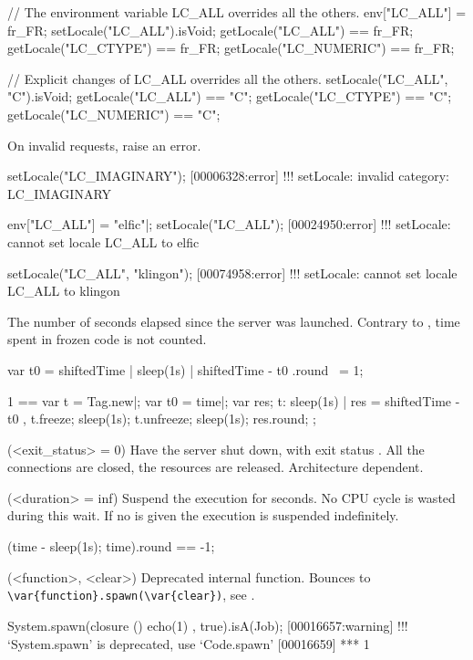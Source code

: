 \begin{urbiscriptapi}
\begin{urbiassert}
// The environment variable LC_ALL overrides all the others.
env["LC_ALL"] = fr_FR;
setLocale("LC_ALL").isVoid;
getLocale("LC_ALL")     == fr_FR;
getLocale("LC_CTYPE")   == fr_FR;
getLocale("LC_NUMERIC") == fr_FR;

// Explicit changes of LC_ALL overrides all the others.
setLocale("LC_ALL", "C").isVoid;
getLocale("LC_ALL")     == "C";
getLocale("LC_CTYPE")   == "C";
getLocale("LC_NUMERIC") == "C";
\end{urbiassert}

  On invalid requests, raise an error.
\begin{urbiscript}
setLocale("LC_IMAGINARY");
[00006328:error] !!! setLocale: invalid category: LC_IMAGINARY

env["LC_ALL"] = "elfic"|;
setLocale("LC_ALL");
[00024950:error] !!! setLocale: cannot set locale LC_ALL to elfic

setLocale("LC_ALL", "klingon");
[00074958:error] !!! setLocale: cannot set locale LC_ALL to klingon
\end{urbiscript}


\item[shiftedTime] The number of seconds elapsed since the \urbi server was
  launched.  Contrary to , time spent in frozen code is not
  counted.
\begin{urbiassert}
{ var t0 = shiftedTime | sleep(1s) | shiftedTime - t0 }.round ~= 1;

  1 ==
  {
    var t = Tag.new|;
    var t0 = time|;
    var res;
    t: { sleep(1s) | res = shiftedTime - t0 },
    t.freeze;
    sleep(1s);
    t.unfreeze;
    sleep(1s);
    res.round;
  };
\end{urbiassert}


\item[shutdown](<exit_status> = 0)%
  Have the \urbi server shut down, with exit status .  All
  the connections are closed, the resources are released.  Architecture
  dependent.


\item[sleep](<duration> = inf)%
  Suspend the execution for  seconds.  No CPU cycle is wasted
  during this wait. If no  is given the execution is suspended
  indefinitely.

\begin{urbiassert}
(time - {sleep(1s); time}).round == -1;
\end{urbiassert}


\item[spawn](<function>, <clear>)%
  Deprecated internal function.  Bounces to
  \lstinline|\var{function}.spawn(\var{clear})|, see .
\begin{urbiassert}
System.spawn(closure () { echo(1) }, true).isA(Job);
[00016657:warning] !!! `System.spawn' is deprecated, use `Code.spawn'
[00016659] *** 1
\end{urbiassert}



\end{urbiscriptapi}
